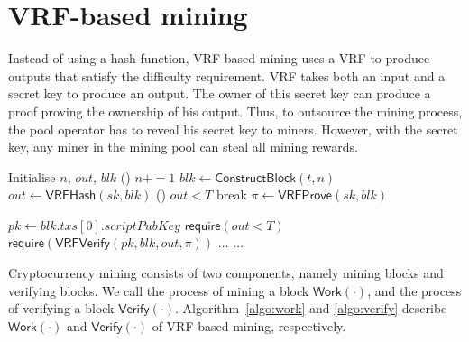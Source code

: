 \section{VRF-based mining}
\label{sec:construction}

Instead of using a hash function, VRF-based mining uses a VRF to produce outputs that satisfy the difficulty requirement.
VRF takes both an input and a secret key to produce an output.
The owner of this secret key can produce a proof proving the ownership of his output.
Thus, to outsource the mining process, the pool operator has to reveal his secret key to miners.
However, with the secret key, any miner in the mining pool can steal all mining rewards.

\begin{algorithm}[]
\caption{$\mathsf{Work}(sk, t, T)$.}\label{algo:work}
\SetAlgoLined\DontPrintSemicolon
{}
  Initialise $n$, $out$, $blk$ 
  \While () {$n += 1$}{
    $blk \gets \mathsf{ConstructBlock}(t, n)$ 
    $out \gets \mathsf{VRFHash}(sk, blk)$ 
    \If () {$out < T$}{
      break 
    }
  }
  $\pi \gets \mathsf{VRFProve}(sk, blk)$ 
   
\end{algorithm}



\begin{algorithm}[h]
\caption{$\mathsf{Verify}(blk, out, \pi, T)$}\label{algo:verify}
\SetAlgoLined\DontPrintSemicolon
$pk \gets blk . txs[0] . scriptPubKey$ 
$\mathsf{require}(out < T)$ 
$\mathsf{require}(\mathsf{VRFVerify}(pk, blk, out, \pi))$ \;
$\dots$ 
$\dots$ 
\end{algorithm}

Cryptocurrency mining consists of two components, namely mining blocks and verifying blocks.
We call the process of mining a block $\mathsf{Work}(\cdot)$, and the process of verifying a block $\mathsf{Verify}(\cdot)$.
Algorithm~\ref{algo:work} and \ref{algo:verify} describe $\mathsf{Work}(\cdot)$ and $\mathsf{Verify}(\cdot)$ of VRF-based mining, respectively.

